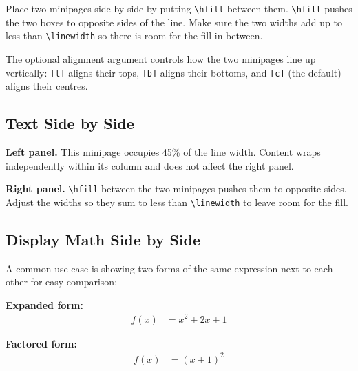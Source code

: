 Place two minipages side by side by putting \texttt{\textbackslash hfill} between them. \texttt{\textbackslash hfill} pushes the two boxes to opposite sides of the line. Make sure the two widths add up to less than \texttt{\textbackslash linewidth} so there is room for the fill in between.

The optional alignment argument controls how the two minipages line up vertically: \texttt{[t]} aligns their tops, \texttt{[b]} aligns their bottoms, and \texttt{[c]} (the default) aligns their centres.

	\subsection{Text Side by Side}
	
	\noindent
	\begin{minipage}[t]{0.45\linewidth}
		\textbf{Left panel.} This minipage occupies 45\% of the line width. Content
		wraps independently within its column and does not affect the right panel.
	\end{minipage}
	\hfill
	\begin{minipage}[t]{0.45\linewidth}
		\textbf{Right panel.} \texttt{\textbackslash hfill} between the two minipages
		pushes them to opposite sides. Adjust the widths so they sum to less than
		\texttt{\textbackslash linewidth} to leave room for the fill.
	\end{minipage}
	
	\subsection{Display Math Side by Side}
	
	A common use case is showing two forms of the same expression next to each other for easy comparison:
	
	\noindent
	\begin{minipage}[t]{0.45\linewidth}
		\textbf{Expanded form:}
		\begin{align*}
			f(x) &= x^2 + 2x + 1
		\end{align*}
	\end{minipage}
	\hfill
	\begin{minipage}[t]{0.45\linewidth}
		\textbf{Factored form:}
		\begin{align*}
			f(x) &= (x + 1)^2
		\end{align*}
	\end{minipage}
	
